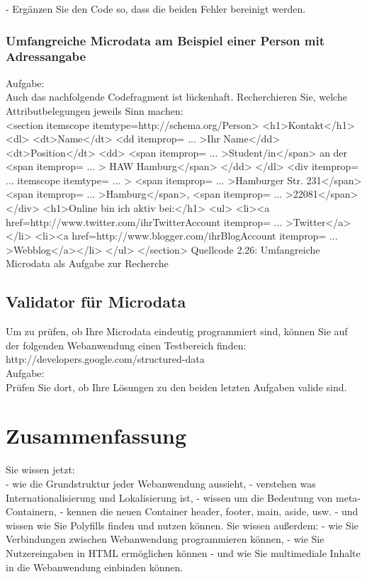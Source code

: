-	Ergänzen Sie den Code so, dass die beiden Fehler bereinigt werden.

\subsubsection{Umfangreiche Microdata am Beispiel einer Person mit Adressangabe}

Aufgabe:\\

Auch das nachfolgende Codefragment ist lückenhaft. Recherchieren Sie, welche Attributbelegungen jeweils Sinn machen:\\

<section itemscope itemtype=http://schema.org/Person>
<h1>Kontakt</h1>
<dl>
<dt>Name</dt>
<dd itemprop= ... >Ihr Name</dd>
<dt>Position</dt>
<dd>
<span itemprop= ... >Student/in</span> an der
<span itemprop= ... > HAW Hamburg</span>
</dd>
</dl>
<div itemprop= ... itemscope itemtype= ... >
<span itemprop= ... >Hamburger Str. 231</span>
<span itemprop= ... >Hamburg</span>,
<span itemprop= ... >22081</span>
</div>
<h1>Online bin ich aktiv bei:</h1>
<ul>
<li><a href=http://www.twitter.com/ihrTwitterAccount itemprop= ... >Twitter</a></li>
<li><a href=http://www.blogger.com/ihrBlogAccount itemprop= ... >Webblog</a></li>
</ul>
</section>
Quellcode 2.26: Umfangreiche Microdata als Aufgabe zur Recherche

\subsection{Validator für Microdata}

Um zu prüfen, ob Ihre Microdata eindeutig programmiert sind, können Sie auf der folgenden Webanwendung einen Testbereich finden:\\

http://developers.google.com/structured-data  \\

Aufgabe:\\

Prüfen Sie dort, ob Ihre Lösungen zu den beiden letzten Aufgaben valide sind.

\section{Zusammenfassung}

Sie wissen jetzt:\\

-	wie die Grundstruktur jeder Webanwendung aussieht,
-	verstehen was Internationalisierung und Lokalisierung ist,
-	wissen um die Bedeutung von meta-Containern,
-	kennen die neuen Container header, footer, main, aside, usw.
-	und wissen wie Sie Polyfills finden und nutzen können.
Sie wissen außerdem:
-	wie Sie Verbindungen zwischen Webanwendung programmieren können,
-	wie Sie Nutzereingaben in HTML ermöglichen können
-	und wie Sie multimediale Inhalte in die Webanwendung einbinden können.\\

